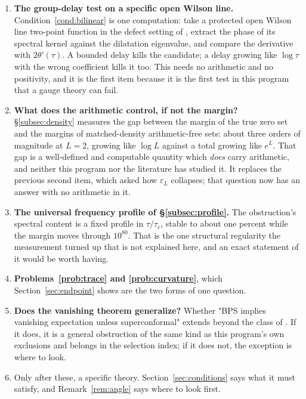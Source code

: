 \begin{enumerate}
\item \textbf{The group-delay test on a specific open Wilson line.}
Condition~\ref{cond:bilinear} is one computation: take a protected open Wilson
line two-point function in the defect setting of \cite{OWL}, extract the phase of
its spectral kernel against the dilatation eigenvalue, and compare the derivative
with $2\theta'(\tau)$. A bounded delay kills the candidate; a delay growing like
$\log\tau$ with the wrong coefficient kills it too. This needs no arithmetic and
no positivity, and it is the first item because it is the first test in this
program that a gauge theory can fail.

\item \textbf{What does the arithmetic control, if not the margin?}
\S\ref{subsec:density} measures the gap between the margin of the true zero set
and the margins of matched-density arithmetic-free sets: about three orders of
magnitude at $L=2$, growing like $\log L$ against a total growing like $e^L$. That
gap is a well-defined and computable quantity which \emph{does} carry arithmetic,
and neither this program nor the literature has studied it. It replaces the
previous second item, which asked how $\varepsilon_L$ collapses; that question now
has an answer with no arithmetic in it.

\item \textbf{The universal frequency profile of \S\ref{subsec:profile}.} The
obstruction's spectral content is a fixed profile in $\tau/\tau_c$, stable to about
one percent while the margin moves through $10^{80}$. That is the one structural
regularity the measurement turned up that is not explained here, and an exact
statement of it would be worth having.

\item \textbf{Problems~\ref{prob:trace} and \ref{prob:curvature}}, which
Section~\ref{sec:endpoint} shows are the two forms of one question.

\item \textbf{Does the vanishing theorem generalize?} Whether "BPS implies
vanishing expectation unless superconformal" extends beyond the class of
\cite{OWL}. If it does, it is a general obstruction of the same kind as this
program's own exclusions and belongs in the selection index; if it does not, the
exception is where to look.

\item Only after these, a specific theory. Section~\ref{sec:conditions} says what
it must satisfy, and Remark~\ref{rem:angle} says where to look first.
\end{enumerate}

